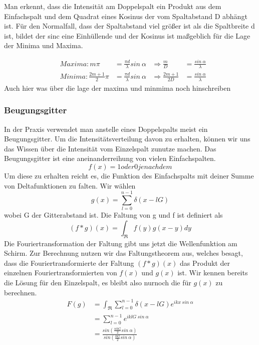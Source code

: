 \documentclass[]{article}
\begin{document}
Man erkennt, dass die Intensität am Doppelspalt ein Produkt aus dem Einfachspalt und dem Quadrat eines Kosinus der vom Spaltabstand D abhängt ist. Für den Normalfall, dass der Spaltabstand viel größer ist als die Spaltbreite d ist, bildet der sinc eine Einhüllende und der Kosinus ist maßgeblich für die Lage der Minima und Maxima.

\begin{align}
	&Maxima: m\pi&=\frac{\pi d}{\lambda}sin \: \alpha &\Rightarrow \frac{m}{D}&= \frac {sin \: \alpha}{\lambda } \\
	&Minima: \frac{2m+1}{2}\pi&=\frac{\pi d}{\lambda}sin \: \alpha &\Rightarrow \frac{2m+1}{2D}&=\frac{sin \: \alpha}{\lambda}	
\end{align}
Auch hier was über die lage der maxima und minmima noch hinschreiben



\subsubsection{Beugungsgitter}
In der Praxis verwendet man anstelle eines Doppelspalts meist ein Beugungsgitter. Um die Intensitätsverteilung davon zu erhalten, können wir uns das Wissen über die Intensität vom Einzelspalt zunutze machen. Das Beugungsgitter ist eine aneinanderreihung von vielen Einfachspalten. 
\begin{equation}
f(x)=1 oder 0 je nachdem
\end{equation}
Um diese zu erhalten reicht es, die Funktion des Einfachspalts mit deiner Summe von Deltafunktionen zu falten. Wir wählen
\begin{equation}
	g(x)=\sum_{l=0}^{n-1}\delta(x-lG)
\end{equation}
wobei G der Gitterabstand ist. Die Faltung von g und f ist definiert als
\begin{equation}
	(f*g)(x)=\int_{\Re} f(y)g(x-y)dy
\end{equation}
Die Fouriertransformation der Faltung gibt uns jetzt die Wellenfunktion am Schirm. Zur Berechnung nutzen wir das Faltungstheorem aus, welches besagt, dass die Fouriertransformierte der Faltung $(f*g)(x)$ das Produkt der einzelnen Fouriertransformierten von $ f(x) $ und $ g(x) $ ist. Wir kennen bereits die Lösung für den Einzelspalt, es bleibt also nurnoch die für $g(x)$ zu berechnen.
\begin{align}
	\textit{F}(g)&=\int_{\Re}\sum_{l=0}^{n-1}\delta(x-lG)e^{ikx \ sin \ \alpha}\\
				&=\sum_{l=0}^{n-1}e^{iklG \ sin \ \alpha}\\
				&=\frac{sin(\frac{nkG}{2}sin \ \alpha)}{sin(\frac{kG}{2}sin \ \alpha)}
\end{align}
\end{document}
